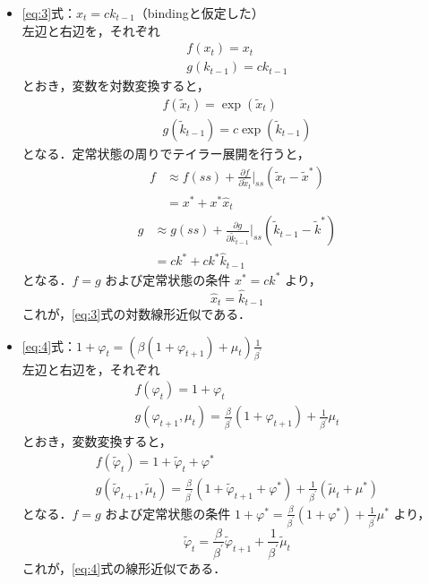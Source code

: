 \documentclass[dvipdfmx]{jlreq}
\begin{document}
\begin{itemize}
  \item \eqref{eq:3}式：$x_t = c k_{t-1}$（bindingと仮定した） \\
    左辺と右辺を，それぞれ
    \begin{gather}
      f(x_t) = x_t \\
      g(k_{t-1}) = c k_{t-1}
    \end{gather}
    とおき，変数を対数変換すると，
    \begin{gather}
      f(\widetilde{x}_t) = \exp(\widetilde{x}_t) \\
      g(\widetilde{k}_{t-1}) = c \exp(\widetilde{k}_{t-1})
    \end{gather}
    となる．定常状態の周りでテイラー展開を行うと，
    \begin{equation}
      \begin{split}
        f &\approx f(ss) + \frac{\partial f}{\partial \widetilde{x}_t} \bigg|_{ss} (\widetilde{x}_t - \widetilde{x}^*) \\
        &= x^* + x^* \widehat{x}_t
      \end{split}
    \end{equation}
    \begin{equation}
      \begin{split}
        g &\approx g(ss) + \frac{\partial g}{\partial \widetilde{k}_{t-1}} \bigg|_{ss} (\widetilde{k}_{t-1} - \widetilde{k}^*) \\
        &= c k^* + c k^* \widehat{k}_{t-1}
      \end{split}
    \end{equation}
    となる．$f=g$ および定常状態の条件 $x^* = c k^*$ より，
    \begin{equation}
      \widehat{x}_t = \widehat{k}_{t-1}
    \end{equation}
    これが，\eqref{eq:3}式の対数線形近似である．

  \item \eqref{eq:4}式：$1 + \varphi_t = (\beta(1+\varphi_{t+1}) + \mu_t) \frac{1}{\beta^\prime}$ \\
    左辺と右辺を，それぞれ
    \begin{gather}
      f(\varphi_t) = 1 + \varphi_t \\
      g(\varphi_{t+1}, \mu_t) = \frac{\beta}{\beta^\prime} (1 + \varphi_{t+1}) + \frac{1}{\beta^\prime} \mu_t
    \end{gather}
    とおき，変数変換すると，
    \begin{gather}
      f(\widetilde{\varphi}_t) = 1 + \widetilde{\varphi}_t + \varphi^* \\
      g(\widetilde{\varphi}_{t+1}, \widetilde{\mu}_t) = \frac{\beta}{\beta^\prime} (1 + \widetilde{\varphi}_{t+1} + \varphi^*) + \frac{1}{\beta^\prime} (\widetilde{\mu}_t + \mu^*)
    \end{gather}
    となる．$f=g$ および定常状態の条件 $1 + \varphi^* = \frac{\beta}{\beta^\prime} (1 + \varphi^*) + \frac{1}{\beta^\prime} \mu^*$ より，
    \begin{equation}
      \widetilde{\varphi}_t = \frac{\beta}{\beta^\prime} \widetilde{\varphi}_{t+1} + \frac{1}{\beta^\prime} \widetilde{\mu}_t
    \end{equation}
    これが，\eqref{eq:4}式の線形近似である．


\end{itemize}
\end{document}
